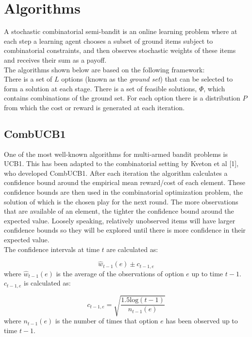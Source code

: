 \pagebreak


\section{Algorithms}

A stochastic combinatorial semi-bandit is an online learning problem where at each step a learning agent chooses a subset of ground items subject to combinatorial constraints, and then observes stochastic weights of these items and receives their sum as a payoff.\\
The algorithms shown below are based on the following framework:\\There is a set of $L$ options (known as the \textit{ground set}) that can be selected to form a solution at each stage. There is a set of feasible solutions, $\Phi$, which contains combinations of the ground set. For each option there is a distribution $P$ from which the cost or reward is generated at each iteration.

\subsection{CombUCB1}

One of the most well-known algorithms for multi-armed bandit problems is UCB1. This has been adapted to the combinatorial setting by Kveton et al [1], who developed CombUCB1. After each iteration the algorithm calculates a confidence bound around the empirical mean reward/cost of each element. These confidence bounds are then used in the combinatorial optimization problem, the solution of which is the chosen play for the next round. The more observations that are available of an element, the tighter the confidence bound around the expected value. Loosely speaking, relatively unobserved items will have larger confidence bounds so they will be explored until there is more confidence in their expected value.\\

The confidence intervals at time $t$ are calculated as:

$$\hat{w}_{t-1}(e)\pm c_{t-1,e}$$ where $\hat{w}_{t-1}(e)$ is the average of the observations of option $e$ up to time $t-1$. $c_{t-1,e}$ is calculated as:

$$c_{t-1,e}=\sqrt{\frac{1.5\textrm{log}(t-1)}{n_{t-1}(e)}}$$ where $n_{t-1}(e)$ is the number of times that option $e$ has been observed up to time $t-1$.\\


